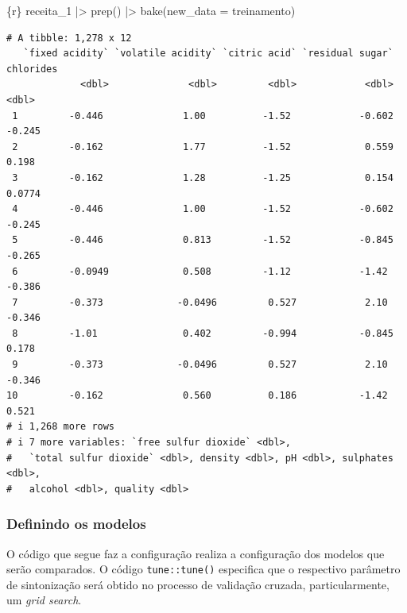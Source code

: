 \documentclass[
  letterpaper,
  DIV=11,
  numbers=noendperiod,
  oneside]{scrartcl}
\newenvironment{Shaded}{\begin{snugshade}}{\end{snugshade}}
\newcommand{\AttributeTok}[1]{\textcolor[rgb]{0.40,0.45,0.13}{#1}}
\newcommand{\FunctionTok}[1]{\textcolor[rgb]{0.28,0.35,0.67}{#1}}
\newcommand{\InformationTok}[1]{\textcolor[rgb]{0.37,0.37,0.37}{#1}}
\newcommand{\NormalTok}[1]{\textcolor[rgb]{0.00,0.23,0.31}{#1}}
\newcommand{\SpecialCharTok}[1]{\textcolor[rgb]{0.37,0.37,0.37}{#1}}
\begin{document}
\begin{Shaded}
\begin{Highlighting}[]
\InformationTok{\textasciigrave{}\textasciigrave{}\textasciigrave{}\{r\}}
\NormalTok{receita\_1 }\SpecialCharTok{|\textgreater{}} 
  \FunctionTok{prep}\NormalTok{() }\SpecialCharTok{|\textgreater{}} 
  \FunctionTok{bake}\NormalTok{(}\AttributeTok{new\_data =}\NormalTok{ treinamento)}
\InformationTok{\textasciigrave{}\textasciigrave{}\textasciigrave{}}
\end{Highlighting}
\end{Shaded}

\begin{verbatim}
# A tibble: 1,278 x 12
   `fixed acidity` `volatile acidity` `citric acid` `residual sugar` chlorides
             <dbl>              <dbl>         <dbl>            <dbl>     <dbl>
 1         -0.446              1.00          -1.52            -0.602   -0.245 
 2         -0.162              1.77          -1.52             0.559    0.198 
 3         -0.162              1.28          -1.25             0.154    0.0774
 4         -0.446              1.00          -1.52            -0.602   -0.245 
 5         -0.446              0.813         -1.52            -0.845   -0.265 
 6         -0.0949             0.508         -1.12            -1.42    -0.386 
 7         -0.373             -0.0496         0.527            2.10    -0.346 
 8         -1.01               0.402         -0.994           -0.845    0.178 
 9         -0.373             -0.0496         0.527            2.10    -0.346 
10         -0.162              0.560          0.186           -1.42     0.521 
# i 1,268 more rows
# i 7 more variables: `free sulfur dioxide` <dbl>,
#   `total sulfur dioxide` <dbl>, density <dbl>, pH <dbl>, sulphates <dbl>,
#   alcohol <dbl>, quality <dbl>
\end{verbatim}

\hypertarget{definindo-os-modelos}{%
\subsubsection{Definindo os modelos}\label{definindo-os-modelos}}

O código que segue faz a configuração realiza a configuração dos modelos
que serão comparados. O código \texttt{tune::tune()} especifica que o
respectivo parâmetro de sintonização será obtido no processo de
validação cruzada, particularmente, um \emph{grid search}.
\end{document}
